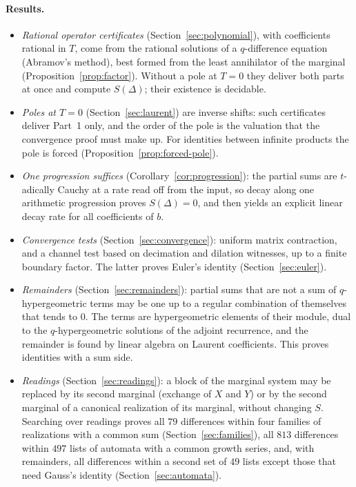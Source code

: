 \documentclass[11pt,a4paper]{article}
\theoremstyle{plain}
\theoremstyle{definition}
\theoremstyle{remark}
\begin{document}
\paragraph{Results.}
\begin{itemize}
\item \emph{Rational operator certificates} (Section~\ref{sec:polynomial}),
  with coefficients rational in $T$, come from the rational solutions of a
  $q$-difference equation (Abramov's method), best formed from the least
  annihilator of the marginal (Proposition~\ref{prop:factor}). Without a pole
  at $T=0$ they deliver both parts at once and compute $S(\Delta)$; their
  existence is decidable.
\item \emph{Poles at $T=0$} (Section~\ref{sec:laurent}) are inverse shifts:
  such certificates deliver Part~1 only, and the order of the pole is the
  valuation that the convergence proof must make up. For identities between
  infinite products the pole is forced (Proposition~\ref{prop:forced-pole}).
\item \emph{One progression suffices} (Corollary~\ref{cor:progression}): the
  partial sums are $t$-adically Cauchy at a rate read off from the input, so
  decay along one arithmetic progression proves $S(\Delta)=0$, and then
  yields an explicit linear decay rate for all coefficients of $b$.
\item \emph{Convergence tests} (Section~\ref{sec:convergence}): uniform matrix
  contraction, and a channel test based on decimation and dilation witnesses,
  up to a finite boundary factor. The latter proves Euler's identity
  (Section~\ref{sec:euler}).
\item \emph{Remainders} (Section~\ref{sec:remainders}): partial sums that are not
  a sum of $q$-hypergeometric terms may be one up to a regular combination of
  themselves that tends to $0$. The terms are hypergeometric elements of their
  module, dual to the $q$-hypergeometric solutions of the adjoint recurrence,
  and the remainder is found by linear algebra on Laurent coefficients. This
  proves identities with a sum side.
\item \emph{Readings} (Section~\ref{sec:readings}): a block of the marginal
  system may be replaced by its second marginal (exchange of $X$ and $Y$) or by
  the second marginal of a canonical realization of its marginal, without
  changing $S$. Searching over readings proves all $79$ differences within
  four families of realizations with a common sum (Section~\ref{sec:families}),
  all $813$ differences within $497$ lists of automata with a common growth
  series, and, with remainders, all differences within a second set of $49$
  lists except those that need Gauss's identity (Section~\ref{sec:automata}).
\end{itemize}
\end{document}
